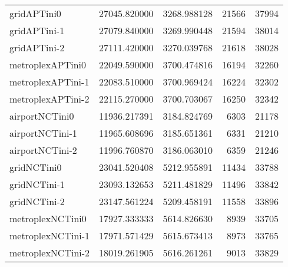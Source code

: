 \begin{table}[h]
\begin{longtable}{lrrrr}
gridAPTini0 & 27045.820000 & 3268.988128 & 21566 & 37994 \\
gridAPTini-1 & 27079.840000 & 3269.990448 & 21594 & 38014 \\
gridAPTini-2 & 27111.420000 & 3270.039768 & 21618 & 38028 \\
metroplexAPTini0 & 22049.590000 & 3700.474816 & 16194 & 32260 \\
metroplexAPTini-1 & 22083.510000 & 3700.969424 & 16224 & 32302 \\
metroplexAPTini-2 & 22115.270000 & 3700.703067 & 16250 & 32342 \\
airportNCTini0 & 11936.217391 & 3184.824769 & 6303 & 21178 \\
airportNCTini-1 & 11965.608696 & 3185.651361 & 6331 & 21210 \\
airportNCTini-2 & 11996.760870 & 3186.063010 & 6359 & 21246 \\
gridNCTini0 & 23041.520408 & 5212.955891 & 11434 & 33788 \\
gridNCTini-1 & 23093.132653 & 5211.481829 & 11496 & 33842 \\
gridNCTini-2 & 23147.561224 & 5209.458191 & 11558 & 33896 \\
metroplexNCTini0 & 17927.333333 & 5614.826630 & 8939 & 33705 \\
metroplexNCTini-1 & 17971.571429 & 5615.673413 & 8973 & 33765 \\
metroplexNCTini-2 & 18019.261905 & 5616.261261 & 9013 & 33829 \\
\end{longtable}
\end{table}

